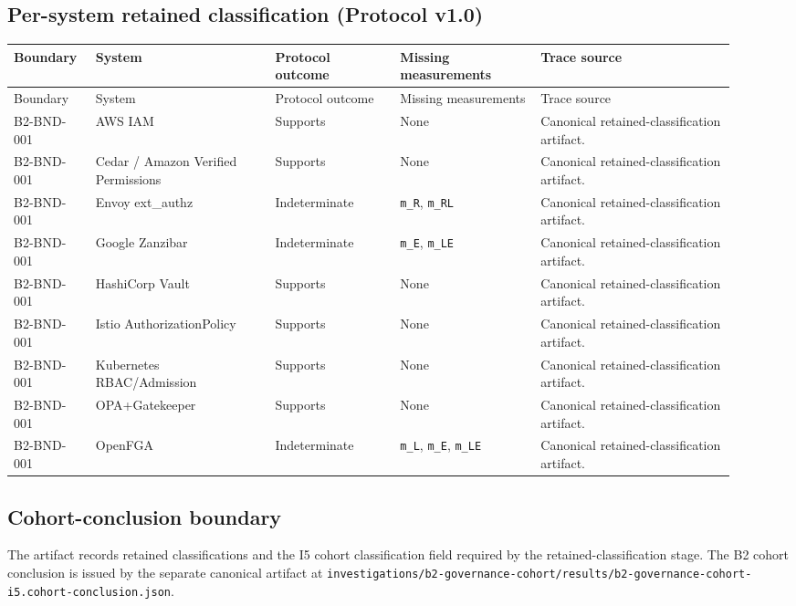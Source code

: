 \subsection{Per-system retained classification (Protocol v1.0)}
\begin{center}
\begin{longtable}{@{}p{0.10\linewidth}p{0.23\linewidth}p{0.16\linewidth}p{0.18\linewidth}p{0.25\linewidth}@{}}
\toprule
Boundary & System & Protocol outcome & Missing measurements & Trace source \\
\midrule
\endfirsthead
\toprule
Boundary & System & Protocol outcome & Missing measurements & Trace source \\
\midrule
\endhead
\bottomrule
\endfoot
\bottomrule
\endlastfoot
B2-BND-001 & AWS IAM & Supports & None & Canonical retained-classification artifact. \\
B2-BND-001 & Cedar / Amazon Verified Permissions & Supports & None & Canonical retained-classification artifact. \\
B2-BND-001 & Envoy ext\_authz & Indeterminate & \texttt{m\_R}, \texttt{m\_RL} & Canonical retained-classification artifact. \\
B2-BND-001 & Google Zanzibar & Indeterminate & \texttt{m\_E}, \texttt{m\_LE} & Canonical retained-classification artifact. \\
B2-BND-001 & HashiCorp Vault & Supports & None & Canonical retained-classification artifact. \\
B2-BND-001 & Istio AuthorizationPolicy & Supports & None & Canonical retained-classification artifact. \\
B2-BND-001 & Kubernetes RBAC/Admission & Supports & None & Canonical retained-classification artifact. \\
B2-BND-001 & OPA+Gatekeeper & Supports & None & Canonical retained-classification artifact. \\
B2-BND-001 & OpenFGA & Indeterminate & \texttt{m\_L}, \texttt{m\_E}, \texttt{m\_LE} & Canonical retained-classification artifact. \\
\end{longtable}
\end{center}

\subsection{Cohort-conclusion boundary}
The artifact records retained classifications and the I5 cohort classification field required by the retained-classification stage. The B2 cohort conclusion is issued by the separate canonical artifact at \texttt{investigations/b2-governance-cohort/results/b2-governance-cohort-i5.cohort-conclusion.json}.
